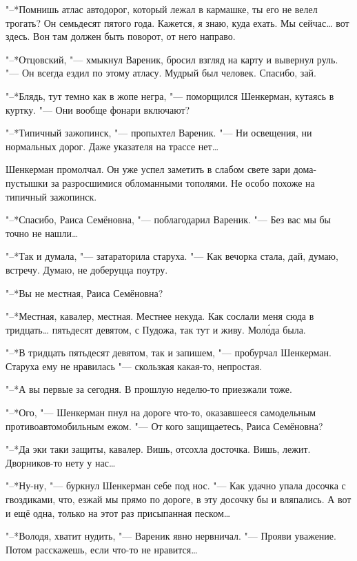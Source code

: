 "--*Помнишь атлас автодорог, который лежал в кармашке, ты его не велел трогать?
Он семьдесят пятого года.
Кажется, я знаю, куда ехать.
Мы сейчас\ldots{} вот здесь.
Вон там должен быть поворот, от него направо.

"--*Отцовский, "--- хмыкнул Вареник, бросил взгляд на карту и вывернул руль.
"--- Он всегда ездил по этому атласу.
Мудрый был человек.
Спасибо, зай.

"--*Блядь, тут темно как в жопе негра, "--- поморщился Шенкерман, кутаясь в куртку.
"--- Они вообще фонари включают?

"--*Типичный зажопинск, "--- пропыхтел Вареник.
"--- Ни освещения, ни нормальных дорог.
Даже указателя на трассе нет\ldots{}

Шенкерман промолчал.
Он уже успел заметить в слабом свете зари дома-пустышки за разросшимися обломанными тополями.
Не особо похоже на типичный зажопинск.

\asterism

\textspace

"--*Спасибо, Раиса Семёновна, "--- поблагодарил Вареник.
"--- Без вас мы бы точно не нашли\ldots{}

"--*Так и думала, "--- затараторила старуха.
"--- Как вечорка стала, дай, думаю, встречу.
Думаю, не доберуцца поутру.

"--*Вы не местная, Раиса Семёновна?

"--*Местная, кавалер, местная.
Местнее некуда.
Как сослали меня сюда в тридцать\ldots{} пятьдесят девятом, с Пудожа, так тут и живу.
Мол\'ода была.

"--*В тридцать пятьдесят девятом, так и запишем, "--- пробурчал Шенкерман.
Старуха ему не нравилась "--- скользкая какая-то, непростая.

"--*А вы первые за сегодня.
В прошлую неделю-то приезжали тоже.

"--*Ого, "--- Шенкерман пнул на дороге что-то, оказавшееся самодельным противоавтомобильным ежом.
"--- От кого защищаетесь, Раиса Семёновна?

"--*Да эки таки защиты, кавалер.
Вишь, отсохла досточка.
Вишь, лежит.
Дворников-то нету у нас\ldots{}

"--*Ну-ну, "--- буркнул Шенкерман себе под нос.
"--- Как удачно упала досочка с гвоздиками, что, езжай мы прямо по дороге, в эту досочку бы и вляпались.
А вот и ещё одна, только на этот раз присыпанная песком\ldots{}

"--*Володя, хватит нудить, "--- Вареник явно нервничал.
"--- Прояви уважение.
Потом расскажешь, если что-то не нравится\ldots{}

